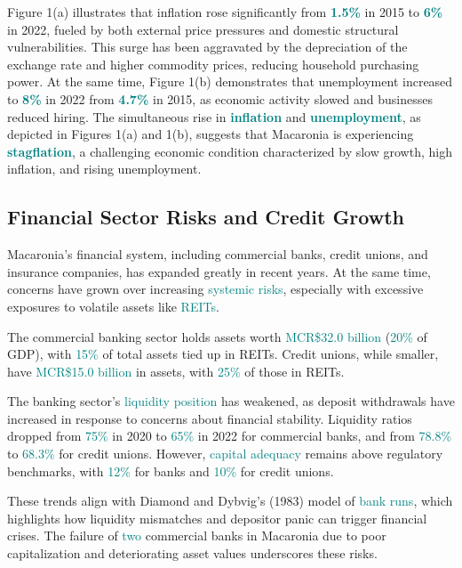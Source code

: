 Figure 1(a) illustrates that inflation rose significantly from \textcolor{teal}{\textbf{1.5\%}}
in 2015 to \textcolor{teal}{\textbf{6\%}} in 2022, fueled by both external price pressures and domestic 
structural vulnerabilities. This surge has been aggravated by the depreciation of the exchange rate and
higher commodity prices, reducing household purchasing power. At the same time, Figure 1(b) demonstrates
that unemployment increased to \textcolor{teal}{\textbf{8\%}} in 2022 from \textcolor{teal}{\textbf{4.7\%}} 
in 2015, as economic activity slowed and businesses reduced hiring. The simultaneous rise 
in \textcolor{teal}{\textbf{inflation}} and \textcolor{teal}{\textbf{unemployment}}, as depicted in
Figures 1(a) and 1(b), suggests that Macaronia is experiencing \textcolor{teal}{\textbf{stagflation}}, 
a challenging economic condition characterized by slow growth, high inflation, and rising unemployment.


\subsection*{Financial Sector Risks and Credit Growth}



Macaronia’s financial system, including commercial banks, credit unions, and insurance companies, 
has expanded greatly in recent years. At the same time, concerns have grown over increasing 
\textcolor{teal}{systemic risks}, especially with excessive exposures to volatile assets like 
\textcolor{teal}{REITs}.  

The commercial banking sector holds assets worth \textcolor{teal}{MCR\$32.0 billion} 
(\textcolor{teal}{20\%} of GDP), with \textcolor{teal}{15\%} of total assets tied up in REITs. 
Credit unions, while smaller, have \textcolor{teal}{MCR\$15.0 billion} in assets, with 
\textcolor{teal}{25\%} of those in REITs.  

The banking sector’s \textcolor{teal}{liquidity position} has weakened, as 
deposit withdrawals have increased in response to concerns about financial stability.
Liquidity ratios dropped from \textcolor{teal}{75\%} in 2020 to \textcolor{teal}{65\%} 
in 2022 for commercial banks, and from \textcolor{teal}{78.8\%} to \textcolor{teal}{68.3\%}
for credit unions. However, \textcolor{teal}{capital adequacy} remains above regulatory benchmarks,
with \textcolor{teal}{12\%} for banks and \textcolor{teal}{10\%} for credit unions.  

These trends align with Diamond and Dybvig’s (1983) model of \textcolor{teal}{bank runs},
which highlights how liquidity mismatches and depositor panic can trigger financial crises. 
The failure of \textcolor{teal}{two} commercial banks in Macaronia due to poor capitalization and
deteriorating asset values underscores these risks.  

